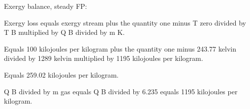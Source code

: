 Exergy balance, steady FP:  

Exergy loss equals exergy stream plus the quantity one minus T zero divided by T B multiplied by Q B divided by m K.  

Equals 100 kilojoules per kilogram plus the quantity one minus 243.77 kelvin divided by 1289 kelvin multiplied by 1195 kilojoules per kilogram.  

Equals 259.02 kilojoules per kilogram.  

Q B divided by m gas equals Q B divided by 6.235 equals 1195 kilojoules per kilogram.